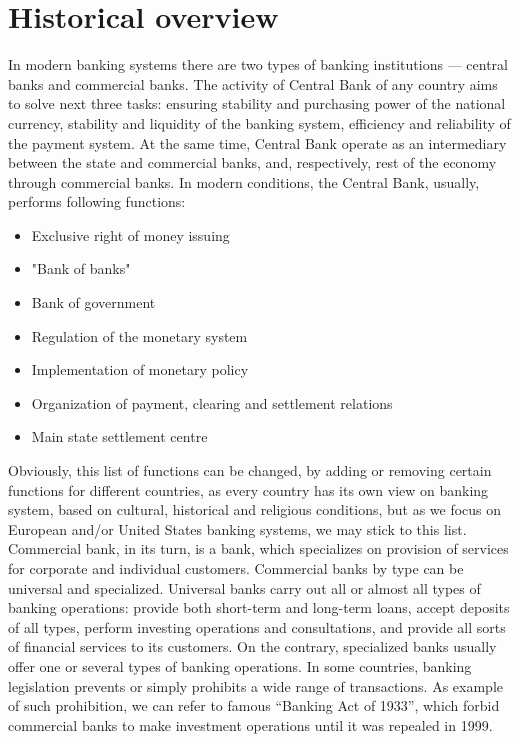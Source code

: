 
\section{Historical overview}

In modern banking systems there are two types of banking institutions — central banks and commercial banks. 
The activity of Central Bank of any country aims to solve next three tasks: ensuring stability and purchasing power of the national currency, stability and liquidity of the banking system, efficiency and reliability of the payment system. 
At the same time, Central Bank operate as an intermediary between the state and commercial banks, and, respectively, rest of the economy through commercial banks.
In modern conditions, the Central Bank, usually, performs following functions:

\begin{itemize}
    \item Exclusive right of money issuing
    \item "Bank of banks"
    \item Bank of government
    \item Regulation of the monetary system
    \item Implementation of monetary policy
    \item Organization of payment, clearing and settlement relations
    \item Main state settlement centre
\end{itemize}

Obviously, this list of functions can be changed, by adding or removing certain functions for different countries, as every country has its own view on banking system, based on cultural, historical and religious conditions, but as we focus on European and/or United States banking systems, we may stick to this list. 
Commercial bank, in its turn, is a bank, which specializes on provision of services for corporate and individual customers. Commercial banks by type can be universal and specialized. Universal banks carry out all or almost all types of banking operations: provide both short-term and long-term loans, accept deposits of all types, perform investing operations and consultations, and provide all sorts of financial services to its customers.
On the contrary, specialized banks usually offer one or several types of banking operations. In some countries, banking legislation prevents or simply prohibits a wide range of transactions. As example of such prohibition, we can refer to famous “Banking Act of 1933”, which forbid commercial banks to make investment operations until it was repealed in 1999.

